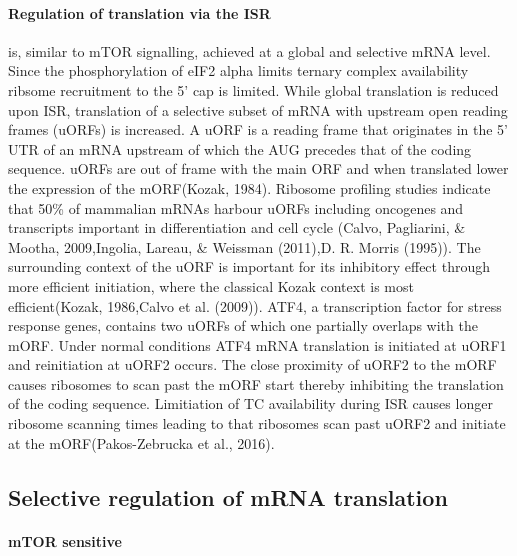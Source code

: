 \documentclass[12pt,openany]{book}
\begin{document}
\paragraph{Regulation of translation via the ISR}

is, similar to mTOR signalling, achieved at a global and selective mRNA
level. Since the phosphorylation of eIF2 alpha limits ternary complex
availability ribsome recruitment to the 5' cap is limited. While global
translation is reduced upon ISR, translation of a selective subset of
mRNA with upstream open reading frames (uORFs) is increased. A uORF is a
reading frame that originates in the 5' UTR of an mRNA upstream of which
the AUG precedes that of the coding sequence. uORFs are out of frame
with the main ORF and when translated lower the expression of the
mORF(Kozak, 1984). Ribosome profiling studies indicate that 50\% of
mammalian mRNAs harbour uORFs including oncogenes and transcripts
important in differentiation and cell cycle (Calvo, Pagliarini, \&
Mootha, 2009,Ingolia, Lareau, \& Weissman (2011),D. R. Morris (1995)).
The surrounding context of the uORF is important for its inhibitory
effect through more efficient initiation, where the classical Kozak
context is most efficient(Kozak, 1986,Calvo et al. (2009)). ATF4, a
transcription factor for stress response genes, contains two uORFs of
which one partially overlaps with the mORF. Under normal conditions ATF4
mRNA translation is initiated at uORF1 and reinitiation at uORF2 occurs.
The close proximity of uORF2 to the mORF causes ribosomes to scan past
the mORF start thereby inhibiting the translation of the coding
sequence. Limitiation of TC availability during ISR causes longer
ribosome scanning times leading to that ribosomes scan past uORF2 and
initiate at the mORF(Pakos-Zebrucka et al., 2016).

\subsection{Selective regulation of mRNA translation} \label{UTR}

\paragraph{mTOR sensitive}
\end{document}
